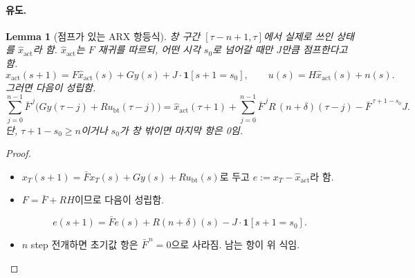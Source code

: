 \documentclass[11pt,a4paper]{article}
\newtheorem{lemma}{Lemma}
\newcommand{\Fb}{\bar F}
\begin{document}
\paragraph{유도.}
\begin{lemma}[점프가 있는 ARX 항등식]
창 구간 $[\tau-n+1,\tau]$에서 실제로 쓰인 상태를 $\hat x_{\mathrm{act}}$라 함.
$\hat x_{\mathrm{act}}$는 $F$ 재귀를 따르되, 어떤 시각 $s_0$로 넘어갈 때만 $J$만큼 점프한다고 함.
\begin{equation}
\hat x_{\mathrm{act}}(s+1)=F\hat x_{\mathrm{act}}(s)+Gy(s)+J\cdot\mathbf 1[s+1=s_0],\qquad u(s)=H\hat x_{\mathrm{act}}(s)+n(s).
\end{equation}
그러면 다음이 성립함.
\begin{equation}
\sum_{j=0}^{n-1}\Fb^{\,j}\bigl(Gy(\tau-j)+Ru_{\mathrm{bt}}(\tau-j)\bigr)
=\hat x_{\mathrm{act}}(\tau+1)+\sum_{j=0}^{n-1}\Fb^{\,j}R\,(n+\delta)(\tau-j)-\Fb^{\,\tau+1-s_0}J .
\end{equation}
단, $\tau+1-s_0\ge n$이거나 $s_0$가 창 밖이면 마지막 항은 0임.
\end{lemma}
\begin{proof}
\begin{itemize}
\item $x_T(s+1)=\Fb x_T(s)+Gy(s)+Ru_{\mathrm{bt}}(s)$로 두고 $e:=x_T-\hat x_{\mathrm{act}}$라 함.
\item $F=\Fb+RH$이므로 다음이 성립함.
\end{itemize}
\begin{equation}
e(s+1)=\Fb e(s)+R(n+\delta)(s)-J\cdot\mathbf 1[s+1=s_0].
\end{equation}
\begin{itemize}
\item $n$ step 전개하면 초기값 항은 $\Fb^{\,n}=0$으로 사라짐. 남는 항이 위 식임.
\end{itemize}
\end{proof}
\end{document}
